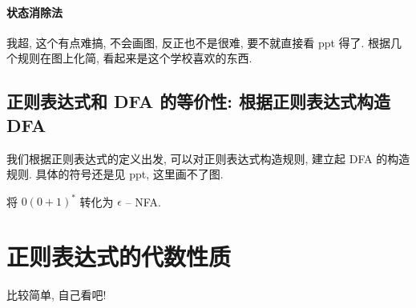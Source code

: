 \documentclass[../main.tex]{subfiles}
\begin{document}
\paragraph{状态消除法} 
我超, 这个有点难搞, 不会画图, 反正也不是很难, 要不就直接看 ppt 得了. 根据几个规则在图上化简, 看起来是这个学校喜欢的东西. 

\subsection{正则表达式和 DFA 的等价性: 根据正则表达式构造 DFA}
我们根据正则表达式的定义出发, 可以对正则表达式构造规则, 建立起 DFA 的构造规则. 具体的符号还是见 ppt, 这里画不了图. 
\begin{exam}
将 \( 0 (0+1)^{*}\) 转化为 \(\epsilon\) -- NFA.
\end{exam}

\section{正则表达式的代数性质}\label{sec:3}
比较简单, 自己看吧!
\end{document}
